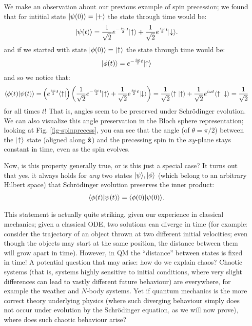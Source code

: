 We make an observation about our previous example of spin precession; we found that for intitial state $\lvert \psi(0) \rangle = \lvert + \rangle$ the state through time would be:
\begin{equation}
    \lvert \psi(t) \rangle = \frac{1}{\sqrt{2}}e^{-\frac{i\omega}{2}t}\lvert \uparrow \rangle + \frac{1}{\sqrt{2}}e^{\frac{i\omega}{2}t}\lvert \downarrow \rangle.
\end{equation}
and if we started with state $\ket{\phi(0)} = \ket{\uparrow}$ the state through time would be:
\begin{equation}
    \ket{\phi(t)} = e^{-\frac{i\omega}{2}t}\ket{\uparrow}
\end{equation}
and so we notice that:
\begin{equation}
    \braket{\phi(t)}{\psi(t)} = \left(e^{\frac{i\omega}{2}t}\bra{\uparrow}\right)\left(\frac{1}{\sqrt{2}}e^{-\frac{i\omega}{2}t}\ket{\uparrow} + \frac{1}{\sqrt{2}}e^{\frac{i\omega}{2}t}\ket{\downarrow}\right) = \frac{1}{\sqrt{2}}\braket{\uparrow}{\uparrow} + \frac{1}{\sqrt{2}}e^{i\omega t}\braket{\uparrow}{\downarrow} = \frac{1}{\sqrt{2}}
\end{equation}
for all times $t$! That is, angles seem to be preserved under Schr\"{o}dinger evolution. We can also visualize this angle preservation in the Bloch sphere representation; looking at Fig. \ref{fig-spinprecess}, you can see that the angle (of $\theta = \pi/2$) between the $\lvert \uparrow \rangle$ state (aligned along $\hat{\mathbf{z}}$) and the precessing spin in the $xy$-plane stays constant in time, even as the spin evolves.


Now, is this property generally true, or is this just a special case? It turns out that yes, it always holds for \emph{any} two states $\ket{\psi}, \ket{\phi}$ (which belong to an arbitrary Hilbert space) that Schr\"{o}dinger evolution preserves the inner product:
\begin{equation}
    \braket{\phi(t)}{\psi(t)} = \braket{\phi(0)}{\psi(0)}.
\end{equation}

This statement is actually quite striking, given our experience in classical mechanics; given a classical ODE, two solutions can diverge in time (for example: consider the trajectory of an object thrown at two different initial velocities; even though the objects may start at the same position, the distance between them will grow apart in time). However, in QM the ``distance'' between states is fixed in time! A potential question that may arise: how do we explain chaos? Chaotic systems (that is, systems highly sensitive to initial conditions, where very slight differences can lead to vastly different future behaviour) are everywhere, for example the weather and $N$-body systems. Yet if quantum mechanics is the more correct theory underlying physics (where such diverging behaviour simply does not occur under evolution by the Schr\"{o}dinger equation, as we will now prove), where does such chaotic behaviour arise?

